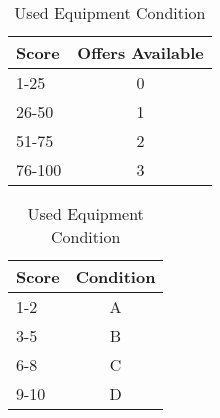 \documentclass[a4paper,10pt]{article}
\begin{document}
\begin{table}
\begin{minipage}{0.5\textwidth}
\begin{center}
  \caption{Used Equipment Availability}
  \begin{tabular}{lc}
    \toprule
    Score  & Offers Available\\
    \midrule
    1-25   & 0\\
    26-50  & 1\\
    51-75  & 2\\
    76-100 & 3\\
    \bottomrule
  \end{tabular}
  \label{tab:usedEquipmentOffers}
\end{center}
\end{minipage}%
%
\begin{minipage}{0.5\textwidth}
\begin{center}
  \caption{Used Equipment Condition}
  \begin{tabular}{lc}
    \toprule
    Score  & Condition\\
    \midrule
    1-2    & A\\
    3-5    & B\\
    6-8    & C\\
    9-10   & D\\
    \bottomrule
  \end{tabular}
  \label{tab:usedEquipmentOfferRatings}
\end{center}
\end{minipage}
\end{table}
\end{document}
